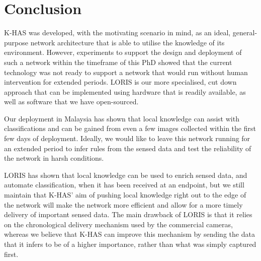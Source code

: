 	\section{Conclusion}\label{loris:conc}
	 K-HAS was developed, with the motivating scenario in mind, as an ideal, general-purpose network architecture that is able to utilise the knowledge of its environment. However, experiments to support the design and deployment of such a network within the timeframe of this PhD showed that the current technology was not ready to support a network that would run without human intervention for extended periods. LORIS is our more specialised, cut down approach that can be implemented using hardware that is readily available, as well as software that we have open-sourced. 
	
	Our deployment in Malaysia has shown that local knowledge can assist with classifications and can be gained from even a few images collected within the first few days of deployment. Ideally, we would like to leave this network running for an extended period to infer rules from the sensed data and test the reliability of the network in harsh conditions. 
	
	LORIS has shown that local knowledge can be used to enrich sensed data, and automate classification, when it has been received at an endpoint, but we still maintain that K-HAS' aim of pushing local knowledge right out to the edge of the network will make the network more efficient and allow for a more timely delivery of important sensed data.  The main drawback of LORIS is that it relies on the chronological delivery mechanism used by the commercial cameras, whereas we believe that K-HAS can improve this mechanism by sending the data that it infers to be of a higher importance, rather than what was simply captured first.